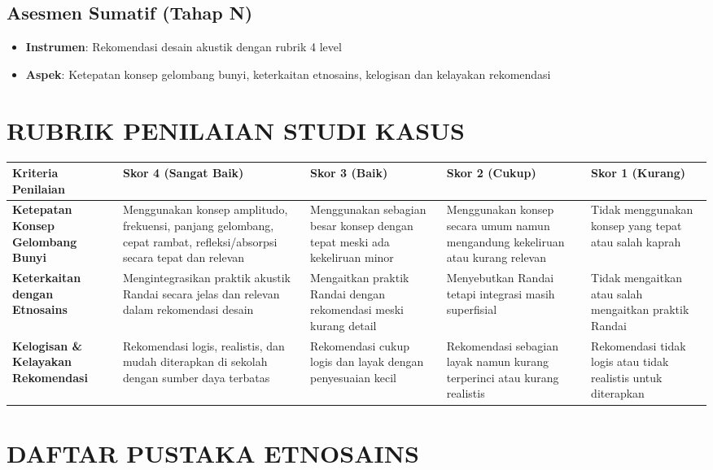 \documentclass[12pt,a4paper]{article}
\begin{document}
\subsection{Asesmen Sumatif (Tahap N)}
\begin{itemize}
\item \textbf{Instrumen}: Rekomendasi desain akustik dengan rubrik 4 level
\item \textbf{Aspek}: Ketepatan konsep gelombang bunyi, keterkaitan etnosains, kelogisan dan kelayakan rekomendasi
\end{itemize}

\section{RUBRIK PENILAIAN STUDI KASUS}

\begin{longtable}{|p{3cm}|p{3cm}|p{3cm}|p{3cm}|p{3cm}|}
\hline
\textbf{Kriteria Penilaian} & \textbf{Skor 4 (Sangat Baik)} & \textbf{Skor 3 (Baik)} & \textbf{Skor 2 (Cukup)} & \textbf{Skor 1 (Kurang)} \\
\hline
\textbf{Ketepatan Konsep Gelombang Bunyi} & Menggunakan konsep amplitudo, frekuensi, panjang gelombang, cepat rambat, refleksi/absorpsi secara tepat dan relevan & Menggunakan sebagian besar konsep dengan tepat meski ada kekeliruan minor & Menggunakan konsep secara umum namun mengandung kekeliruan atau kurang relevan & Tidak menggunakan konsep yang tepat atau salah kaprah \\
\hline
\textbf{Keterkaitan dengan Etnosains} & Mengintegrasikan praktik akustik Randai secara jelas dan relevan dalam rekomendasi desain & Mengaitkan praktik Randai dengan rekomendasi meski kurang detail & Menyebutkan Randai tetapi integrasi masih superfisial & Tidak mengaitkan atau salah mengaitkan praktik Randai \\
\hline
\textbf{Kelogisan \& Kelayakan Rekomendasi} & Rekomendasi logis, realistis, dan mudah diterapkan di sekolah dengan sumber daya terbatas & Rekomendasi cukup logis dan layak dengan penyesuaian kecil & Rekomendasi sebagian layak namun kurang terperinci atau kurang realistis & Rekomendasi tidak logis atau tidak realistis untuk diterapkan \\
\hline
\end{longtable}

\vspace{1cm}

\section{DAFTAR PUSTAKA ETNOSAINS}
\end{document}
